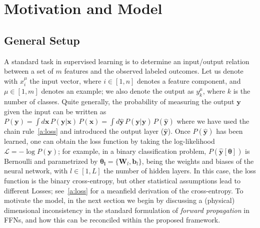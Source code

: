 \documentclass{article}
\begin{document}
\section{Motivation and Model} \label{sec:model}

\subsection{General Setup} \label{sub:setup}

A standard task in supervised learning is to determine an input/output relation between a set of $m$ features and the observed labeled outcomes. Let us denote with $x^{\mu}_i$ the input vector, where $i \in [1, n]$ denotes a feature component, and $\mu \in [1,m]$ denotes an example; we also denote the output as $y^{\mu}_k$, where $k$ is the number of classes. Quite generally, the probability of measuring the output $\mathbf{y}$ given the input can be written as $P(\mathbf{y}) = \int d\mathbf{x} \, P(\mathbf{y} | \mathbf{x}) \, P(\mathbf{x})  =  \int d \hat{\mathbf{y}} \, P(\mathbf{y} | \hat{\mathbf{y}} ) \, P(\hat{\mathbf{y}})$
%
%
%
 where we have used the chain rule~\eqref{a:loss} and introduced the output layer ($\hat{ \mathbf{y}}$). Once $P(\hat{\mathbf{y}})$ has been learned, one can obtain the loss function by taking the log-likelihood $\mathscr{L} = - \log P(\mathbf{y})$; for example, in a binary classification problem, $P(\hat{\mathbf{y}}[\boldsymbol{\theta}])$ is Bernoulli and parametrized by $\boldsymbol{\theta_l} = \{\mathbf{W}_l,\mathbf{ b}_l \}$, being the weights and biases of the neural network, with $l \in [1, L]$ the number of hidden layers. In this case, the loss function is the binary cross-entropy, but other statistical assumptions lead to different Losses; see~\eqref{a:loss} for a meanfield derivation of the cross-entropy. To motivate the model, in the next section we begin by discussing a (physical) dimensional inconsistency in the standard formulation of {\it forward propagation} in FFNs, and how this can be reconciled within the proposed framework.

\end{document}
